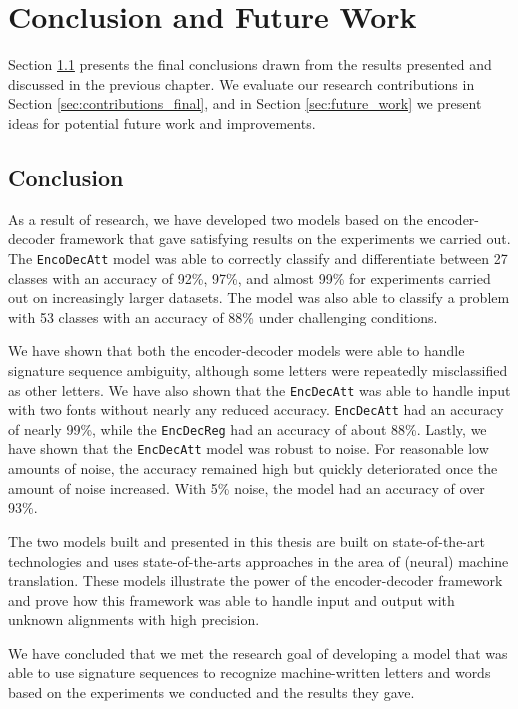 
\chapter{Conclusion and Future Work}
\label{ch:conclusion}
Section \ref{sec:conclusion} presents the final conclusions drawn from the results presented and discussed in the previous chapter. We evaluate our research contributions in Section \ref{sec:contributions_final}, and in Section \ref{sec:future_work} we present ideas for potential future work and improvements.

\section{Conclusion}
\label{sec:conclusion}
As a result of research, we have developed two models based on the encoder-decoder framework that gave satisfying results on the experiments we carried out. The {\tt EncoDecAtt} model was able to correctly classify and differentiate between 27 classes with an accuracy of 92\%, 97\%, and almost 99\% for experiments carried out on increasingly larger datasets. The model was also able to classify a problem with 53 classes with an accuracy of 88\% under challenging conditions.

We have shown that both the encoder-decoder models were able to handle signature sequence ambiguity, although some letters were repeatedly misclassified as other letters. We have also shown that the {\tt EncDecAtt} was able to handle input with two fonts without nearly any reduced accuracy. {\tt EncDecAtt} had an accuracy of nearly 99\%, while the {\tt EncDecReg} had an accuracy of about 88\%. Lastly, we have shown that the {\tt EncDecAtt} model was robust to noise. For reasonable low amounts of noise, the accuracy remained high but quickly deteriorated once the amount of noise increased. With 5\% noise, the model had an accuracy of over 93\%.

The two models built and presented in this thesis are built on state-of-the-art technologies and uses state-of-the-arts approaches in the area of (neural) machine translation. These models illustrate the power of the encoder-decoder framework and prove how this framework was able to handle input and output with unknown alignments with high precision.

We have concluded that we met the research goal of developing a model that was able to use signature sequences to recognize machine-written letters and words based on the experiments we conducted and the results they gave.

